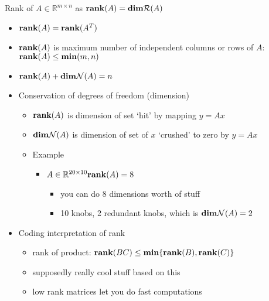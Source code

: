 \documentclass[10pt,letterpaper]{article}
\begin{document}
Rank of $A \in \mathbb{R}^{m \times n}$ as ${\bf rank}(A)= {\bf dim} \mathcal{R}(A)$
\begin{itemize}
\item ${\bf rank} (A)= {\bf rank} (A^T)$
\item ${\bf rank} (A)$ is maximum number of independent columns or rows of $A$: ${\bf rank} (A) \le {\bf min} (m,n)$
\item ${\bf rank} (A)+ {\bf dim} \mathcal{N}(A)=n$
\end{itemize}
\begin{itemize}

\item Conservation of degrees of freedom (dimension)
\label{sec-2_2_5_1}%
\begin{itemize}
\item ${\bf rank} (A)$ is dimension of set `hit' by mapping $y=Ax$
\item ${\bf dim} \mathcal{N}(A)$ is dimension of set of $x$ `crushed' to zero by $y=Ax$
\end{itemize}
\begin{itemize}

\item Example
\label{sec-2_2_5_1_1}%
\begin{itemize}
\item $A \in \mathbb{R}^{20 \times 10} {\bf rank} (A)=8$

\begin{itemize}
\item you can do 8 dimensions worth of stuff
\item 10 knobs, 2 redundant knobs, which is ${\bf dim} \mathcal{N}(A)=2$
\end{itemize}

\end{itemize}
\end{itemize} %

\item Coding interpretation of rank
\label{sec-2_2_5_2}%
\begin{itemize}
\item rank of product: ${\bf rank} (BC) \le {\bf min} \{ {\bf rank} (B), {\bf rank} (C)\}$
\item supposedly really cool stuff based on this
\item low rank matrices let you do fast computations
\end{itemize}
\end{itemize} %
\end{document}
